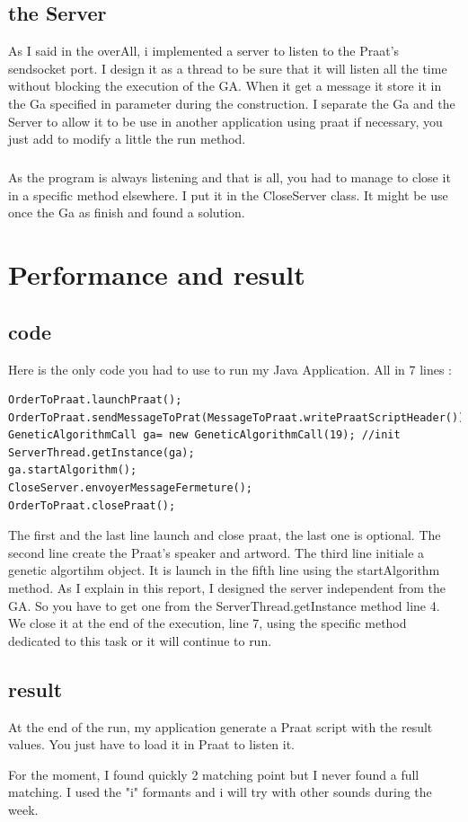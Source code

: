 \documentclass[12pt]{report}
\begin{document}
\section{the Server}
As I said in the overAll, i implemented a server to listen to the Praat's sendsocket port.
I design it as a thread to be sure that it will listen all the time without blocking the execution of the GA. When it get a message it store it in the Ga specified in parameter during the construction. I separate
the Ga and the Server to allow it to be use in another application using praat if necessary, you just add to modify a little the run method. 

\paragraph*{}
As the program is always listening and that is all, you had to manage to close it in a specific method elsewhere.
I put it in the CloseServer class. It might be use once the Ga as finish and found a solution.

\chapter{Performance and result}

\section{code}
Here is the only code you had to use to run my Java Application. All in 7 lines :

\begin{lstlisting}
OrderToPraat.launchPraat();
OrderToPraat.sendMessageToPrat(MessageToPraat.writePraatScriptHeader());
GeneticAlgorithmCall ga= new GeneticAlgorithmCall(19); //init
ServerThread.getInstance(ga);
ga.startAlgorithm();
CloseServer.envoyerMessageFermeture();
OrderToPraat.closePraat();
\end{lstlisting}

The first and the last line launch and close praat, the last one is optional.
The second line create the Praat's speaker and artword.
The third line initiale a genetic algortihm object. It is launch in the fifth line using the startAlgorithm method.
As I explain in this report, I designed the server independent from the GA. So you have to get one from the ServerThread.getInstance method line 4.
We close it at the end of the execution, line 7, using the specific method dedicated to this task or it will continue to run.

\section{result}
At the end of the run, my application generate a Praat script with the result values.
You just have to load it in Praat to listen it.

For the moment, I found quickly 2 matching point but I never found a full matching. I used the "i" formants and i will try with other sounds during the week.

\listoffigures

 
\end{document}
